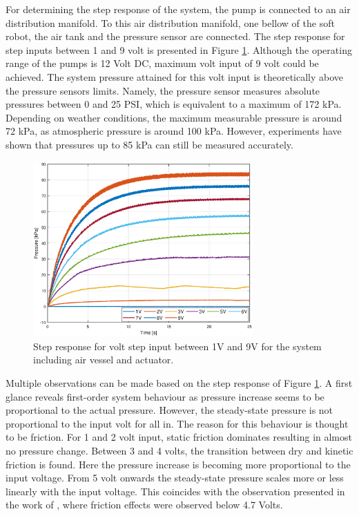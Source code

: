 For determining the step response of the system, the pump is connected to an air distribution manifold. To this air distribution manifold, one bellow of the soft robot, the air tank and the pressure sensor are connected. The step response for step inputs between 1 and 9 volt is presented in Figure \ref{fig3:pump_dynamics_adapted}. Although the operating range of the pumps is 12 Volt DC, maximum volt input of 9 volt could be achieved. The system pressure attained for this volt input is theoretically above the pressure sensors limits. Namely, the pressure sensor measures absolute pressures between 0 and 25 PSI, which is equivalent to a maximum of 172 kPa. Depending on weather conditions, the maximum measurable pressure is around 72 kPa, as atmospheric pressure is around 100 kPa. However, experiments have shown that pressures up to 85 kPa can still be measured accurately.  

\begin{figure}[H]
    \centering
    \includegraphics[width = 0.75\textwidth]{Figures/Chapter3/stepnewairtankbellow.eps}
    \caption{Step response for volt step input between 1V and 9V for the system including air vessel and actuator.}
    \label{fig3:pump_dynamics_adapted}
\end{figure}


Multiple observations can be made based on the step response of Figure \ref{fig3:pump_dynamics_adapted}. A first glance reveals first-order system behaviour as pressure increase seems to be proportional to the actual pressure. However, the steady-state pressure is not proportional to the input volt for all in. The reason for this behaviour is thought to be friction. For 1 and 2 volt input, static friction dominates resulting in almost no pressure change. Between 3 and 4 volts, the transition between dry and kinetic friction is found. Here the pressure increase is becoming more proportional to the input voltage. From 5 volt onwards the steady-state pressure scales more or less linearly with the input voltage. This coincides with the observation presented in the work of \cite{berkers}, where friction effects were observed below 4.7 Volts.

